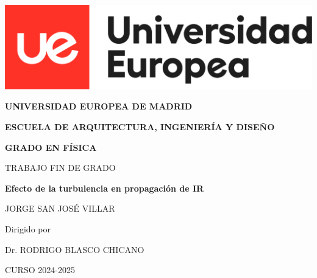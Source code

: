 
\begin{titlepage}

    \includegraphics[width=\linewidth]{figures/UEM-Logo-letra2.png}

    \vspace*{1cm}
    
    \begin{center}
        \Large\textbf{UNIVERSIDAD EUROPEA DE MADRID} 
        
        \vspace{2cm}
        \large\textbf{ESCUELA DE ARQUITECTURA, INGENIERÍA Y DISEÑO} 
        
        \vspace{1.3cm}
        \large\textbf{GRADO EN FÍSICA} 
        
        \vspace{3cm}
        \large TRABAJO FIN DE GRADO 
        
        \vspace{1.4cm}
        \Large\textbf{Efecto de la turbulencia en propagación de IR}
        
    \end{center}
    
    \begin{center}
        \vspace{1.2cm}
        \large JORGE SAN JOSÉ VILLAR 
        
        Dirigido por
        
        Dr. RODRIGO BLASCO CHICANO
    \end{center}
    

    \begin{center}
        CURSO 2024-2025
    \end{center}

\end{titlepage}

